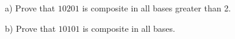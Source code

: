 a) Prove that $10201$ is composite in all bases greater than 2.

b) Prove that $10101$ is composite in all bases.